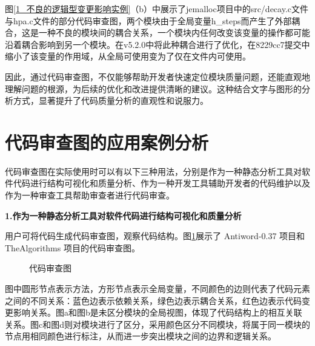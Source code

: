 图\ref{1_不良的逻辑型变更影响实例}（b）中展示了jemalloc项目中的src/decay.c文件与hpa.c文件的部分代码审查图，两个模块由于全局变量h\_steps而产生了外部耦合，这是一种不良的模块间的耦合关系，一个模块内任何改变该变量的操作都可能沿着耦合影响到另一个模块。在v5.2.0中将此种耦合进行了优化，在8229cc7提交中缩小了该变量的作用域，从全局可使用变为了仅在文件内可使用。


因此，通过代码审查图，不仅能够帮助开发者快速定位模块质量问题，还能直观地理解问题的根源，为后续的优化和改进提供清晰的建议。这种结合文字与图形的分析方式，显著提升了代码质量分析的直观性和说服力。


\section{代码审查图的应用案例分析}

代码审查图在实际使用时可以有以下三种用法，分别是作为一种静态分析工具对软件代码进行结构可视化和质量分析、作为一种开发工具辅助开发者的代码维护以及作为一种审查工具帮助审查者进行代码审查。

\noindent \textbf{1.作为一种静态分析工具对软件代码进行结构可视化和质量分析} 

用户可将代码生成代码审查图，观察代码结构。图\ref{4_代码审查图}展示了 Antiword-0.37 项目和 TheAlgorithms 项目的代码审查图。

\begin{figure}[!h]
    \setlength{\subfigcapskip}{-1bp}
    \centering
    \begin{minipage}{\textwidth}
    \centering
    \hspace{2em}
    \end{minipage}
    \centering
    \begin{minipage}{\textwidth}
    \centering
    \hspace{2em}
    \end{minipage}
    \vspace{0.2em}
    \caption{代码审查图} %
    \label{4_代码审查图}
\end{figure}


图中圆形节点表示方法，方形节点表示全局变量，不同颜色的边则代表了代码元素之间的不同关系：蓝色边表示依赖关系，绿色边表示耦合关系，红色边表示代码变更影响关系。图a和图b是未区分模块的全局视图，体现了代码结构上的相互关联关系。图c和图d则对模块进行了区分，采用颜色区分不同模块，将属于同一模块的节点用相同颜色进行标注，从而进一步突出模块之间的边界和逻辑关系。

